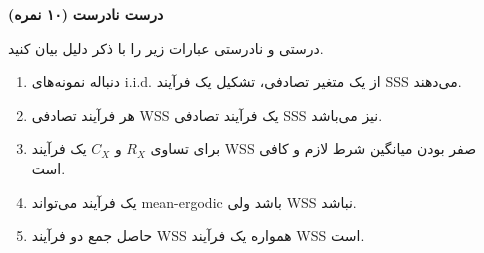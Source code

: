 \Large \textbf{درست نادرست}
\large \textbf{(۱۰ نمره)}

\normalsize \vspace{0.5cm}
درستی و نادرستی عبارات زیر را با ذکر دلیل بیان کنید.
\begin{enumerate}[label=(\alph*)]
	\item
دنباله نمونه‌های i.i.d. از یک متغیر تصادفی، تشکیل یک فرآیند SSS می‌دهند.
	\item
هر فرآیند تصادفی WSS یک فرآیند تصادفی SSS نیز می‌باشد.
	\item
 برای تساوی 
$ R_X $
 و
$ C_X $
 یک فرآیند WSS صفر بودن میانگین شرط لازم و کافی است.

	\item
یک فرآیند می‌تواند mean-ergodic باشد ولی WSS نباشد.
	\item
حاصل جمع دو فرآیند WSS همواره یک فرآیند WSS است.
\end{enumerate}
